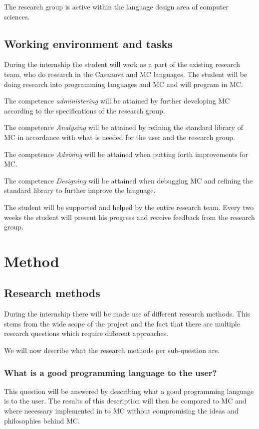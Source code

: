 The research group is active within the language design area of computer sciences.


\subsection{Working environment and tasks}\label{sec:workenvmandate}
During the internship the student will work as a part of the existing research team, who do research in the Casanova and MC languages.
The student will be doing research into programming languages and MC and will program in MC.

The competence \emph{administering} will be attained by further developing MC according to the specifications of the research group.

The competence \emph{Analysing} will be attained by refining the standard library of MC in accordance with what is needed for the user and the research group.

The competence \emph{Advising} will be attained when putting forth improvements for MC.

The competence \emph{Designing} will be attained when debugging MC and refining the standard library to further improve the language.

The student will be supported and helped by the entire research team.
Every two weeks the student will present his progress and receive feedback from the research group.


\section{Method}\label{ch:methodmandate}
\subsection{Research methods}
During the internship there will be made use of different research methods.
This stems from the wide scope of the project and the fact that there are multiple research questions which require different approaches.

We will now describe what the research methods per sub-question are.


\subsubsection{What is a good programming language to the user?}
This question will be answered by describing what a good programming language is to the user.
The results of this description will then be compared to MC and where necessary implemented in to MC without compromising the ideas and philosophies behind MC.

